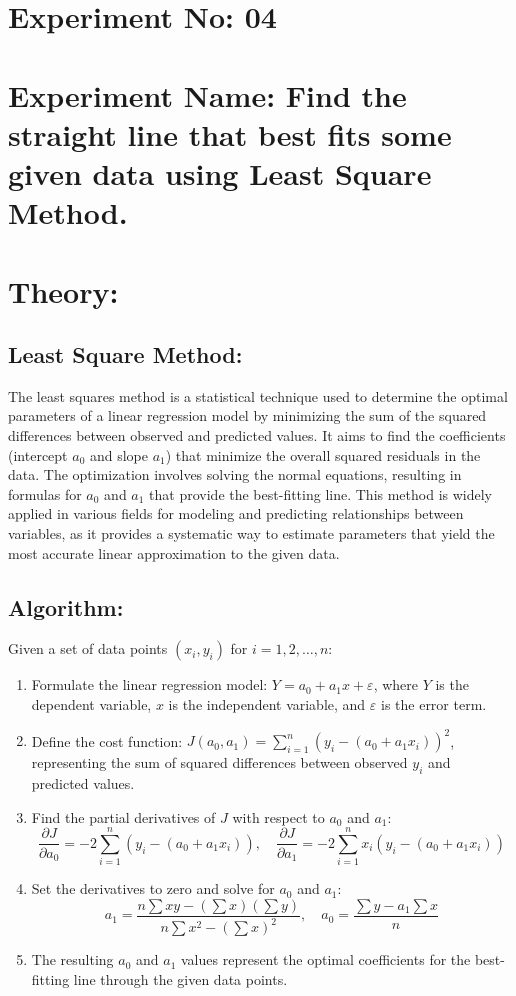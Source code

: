 \documentclass[a4paper,12pt]{report}
\begin{document}
\section*{Experiment No: 04}
\section*{Experiment Name: \small Find the straight line that best fits some given data using Least Square Method.}
\section*{Theory:}

\subsection*{Least Square Method:}
\qquad The least squares method is a statistical technique used to determine the optimal parameters of a linear regression model by minimizing the sum of the squared differences between observed and predicted values. It aims to find the coefficients (intercept $a_0$ and slope $a_1$) that minimize the overall squared residuals in the data. The optimization involves solving the normal equations, resulting in formulas for $a_0$ and $a_1$ that provide the best-fitting line. This method is widely applied in various fields for modeling and predicting relationships between variables, as it provides a systematic way to estimate parameters that yield the most accurate linear approximation to the given data.

\subsection*{Algorithm:}
Given a set of data points $ (x_i, y_i) $ for $ i = 1, 2, \ldots, n $:

\begin{enumerate}
    \item Formulate the linear regression model: $ Y = a_0 + a_1x + \varepsilon $, where $ Y $ is the dependent variable, $ x $ is the independent variable, and $ \varepsilon $ is the error term.
    \item Define the cost function: $ J(a_0, a_1) = \sum_{i=1}^{n} (y_i - (a_0 + a_1x_i))^2 $, representing the sum of squared differences between observed $ y_i $ and predicted values.
    \item Find the partial derivatives of $ J $ with respect to $ a_0 $ and $ a_1 $:
          \[
              \frac{\partial J}{\partial a_0} = -2 \sum_{i=1}^{n} (y_i - (a_0 + a_1x_i)), \quad
              \frac{\partial J}{\partial a_1} = -2 \sum_{i=1}^{n} x_i(y_i - (a_0 + a_1x_i))
          \]
    \item Set the derivatives to zero and solve for $ a_0 $ and $ a_1 $:
          \[
              a_1 = \frac{n\sum xy - (\sum x)(\sum y)}{n\sum x^2 - (\sum x)^2}, \quad
              a_0 = \frac{\sum y - a_1\sum x}{n}
          \]
    \item The resulting $ a_0 $ and $ a_1 $ values represent the optimal coefficients for the best-fitting line through the given data points.
\end{enumerate}
\end{document}

